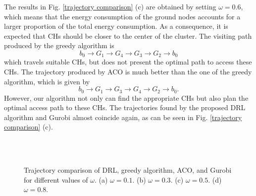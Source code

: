 \documentclass[journal]{IEEEtran}
\begin{document}
The results in Fig. \ref{trajectory comparison} (c) are obtained by setting $\omega = 0.6$, which means that the energy consumption of the ground nodes accounts for a larger proportion of the total energy consumption. As a consequence, it is expected that CHs should be closer to the center of the cluster. The visiting path produced by the greedy algorithm is
\begin{equation*}
    b_0 \rightarrow G_{1} \rightarrow G_{4}  \rightarrow G_{3} \rightarrow G_{2} \rightarrow b_0
\end{equation*}
which travels suitable CHs, but does not present the optimal path to access these CHs. The trajectory produced by ACO is much better than the one of the greedy algorithm, which is given by
\begin{equation*}
    b_0 \rightarrow G_{1} \rightarrow G_{3}  \rightarrow G_{4} \rightarrow G_{2} \rightarrow b_0.
\end{equation*}
However, our algorithm not only can find the appropriate CHs but also plan the optimal access path to these CHs. The trajectories found by the proposed DRL algorithm and Gurobi almost coincide again, as can be seen in Fig. \ref{trajectory comparison} (c).



\begin{figure*}[!t]
	\centering
	 \hspace{-0.2in}
	 \\
	
	 \hspace{-0.2in}
	 \\
	\caption{{Trajectory comparison of DRL, greedy algorithm, ACO, and Gurobi for different values of $\omega$. (a) $\omega = 0.1$. (b) $\omega = 0.3$. (c) $\omega = 0.5$. (d) $\omega = 0.8$.}}
	\label{seven clusters trajectory comparison}
	\vspace{0in}
\end{figure*}
\end{document}
